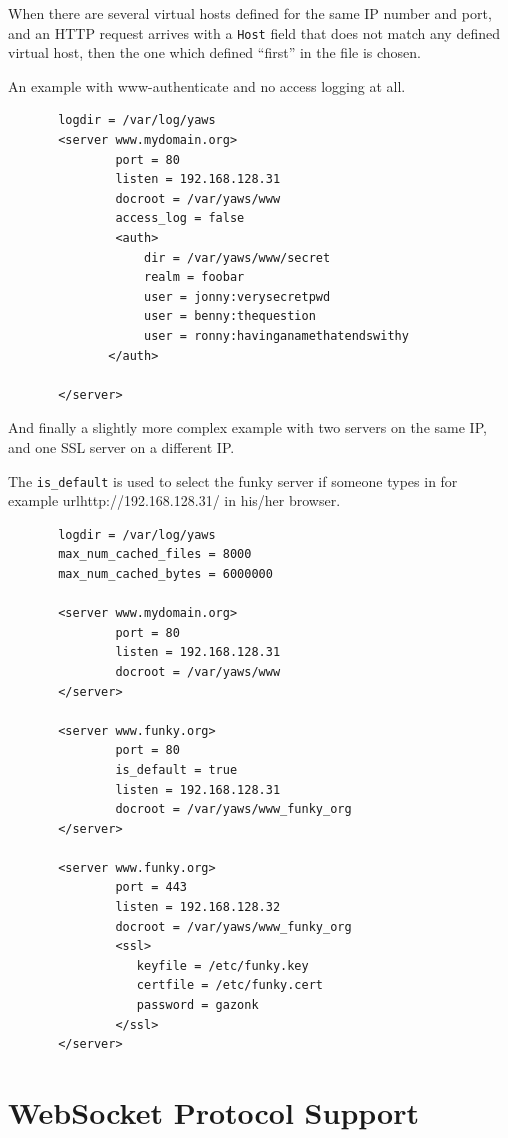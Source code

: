 \documentclass[11pt,oneside,english]{book}
\begin{document}
When there are several virtual hosts defined for the same IP number
and port, and an HTTP request arrives with a \verb+Host+ field that
does not match any defined virtual host, then the one which defined
``first'' in the file is chosen.

An example with www-authenticate and no access logging at all.

\begin{verbatim}
       logdir = /var/log/yaws
       <server www.mydomain.org>
               port = 80
               listen = 192.168.128.31
               docroot = /var/yaws/www
               access_log = false
               <auth>
                   dir = /var/yaws/www/secret
                   realm = foobar
                   user = jonny:verysecretpwd
                   user = benny:thequestion
                   user = ronny:havinganamethatendswithy
              </auth>

       </server>
\end{verbatim}

       And  finally  a  slightly more complex example with
       two servers on the same IP, and one SSL server on a
       different IP.

       The \verb+is_default+ is used to select the funky server if
       someone types in for example url{http://192.168.128.31/} in
       his\slash her browser.


\begin{verbatim}
       logdir = /var/log/yaws
       max_num_cached_files = 8000
       max_num_cached_bytes = 6000000

       <server www.mydomain.org>
               port = 80
               listen = 192.168.128.31
               docroot = /var/yaws/www
       </server>

       <server www.funky.org>
               port = 80
               is_default = true
               listen = 192.168.128.31
               docroot = /var/yaws/www_funky_org
       </server>

       <server www.funky.org>
               port = 443
               listen = 192.168.128.32
               docroot = /var/yaws/www_funky_org
               <ssl>
                  keyfile = /etc/funky.key
                  certfile = /etc/funky.cert
                  password = gazonk
               </ssl>
       </server>
\end{verbatim}

\chapter{WebSocket Protocol Support}
\label{websockets}
\end{document}
